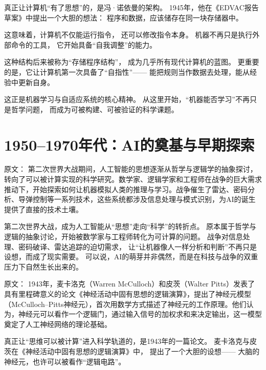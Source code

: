 
真正让计算机“有了思想”的，是冯·诺依曼的架构。
1945年，他在《EDVAC报告草案》中提出一个大胆的想法：
程序和数据，应该储存在同一块存储器中。

这意味着，计算机不仅能运行指令，
还可以修改指令本身。
机器不再只是执行外部命令的工具，
它开始具备“自我调整”的能力。

这种结构后来被称为“存储程序结构”，
成为几乎所有现代计算机的蓝图。
更重要的是，它让计算机第一次具备了“自指性”——
能把规则当作数据去处理，能从经验中更新自身。

这正是机器学习与自适应系统的核心精神。
从这里开始，“机器能否学习”不再只是哲学问题，
而成为可被构建、可被验证的科学课题。

\section{1950–1970年代：AI的奠基与早期探索}

原文：
第二次世界大战期间，人工智能的思想逐渐从哲学与逻辑学的抽象探讨，转向了可以被计算实现的科学研究。数学家、逻辑学家和工程师在战争的巨大需求推动下，开始探索如何让机器模拟人类的推理与学习。战争催生了雷达、密码分析、导弹控制等一系列技术，这些系统都涉及信息处理与模式识别，为AI的诞生提供了直接的技术土壤。


第二次世界大战，成为人工智能从“思想”走向“科学”的转折点。
原本属于哲学与逻辑的抽象讨论，开始被数学家与工程师转化为可计算的问题。
战争对信息处理、密码破译、雷达追踪的迫切需求，
让“让机器像人一样分析和判断”不再只是设想，而成了现实需要。
可以说，AI的萌芽并非偶然，而是在科技与战争的双重压力下自然生长出来的。

原文：
1943年，麦卡洛克（Warren McCulloch）和皮茨（Walter Pitts）发表了具有里程碑意义的论文《神经活动中固有思想的逻辑演算》，提出了神经元模型（McCulloch–Pitts神经元），首次用数学方式描述了神经元的工作原理。他们认为，神经元可以看作一个逻辑门，通过输入信号的加权求和来决定输出，这一模型奠定了人工神经网络的理论基础。


真正让“思维可以被计算”进入科学轨道的，是1943年的一篇论文。
麦卡洛克与皮茨在《神经活动中固有思想的逻辑演算》中，
提出了一个大胆的设想——
大脑的神经元，也许可以被看作“逻辑电路”。

